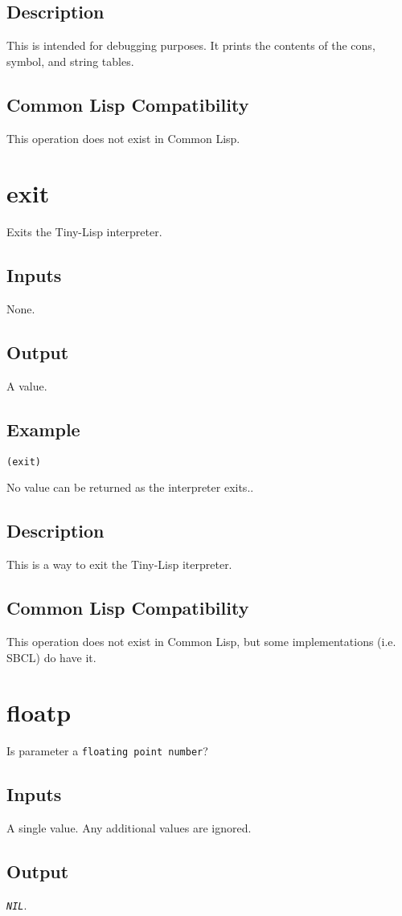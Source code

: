 \documentclass[10pt, openany]{book}
\newcommand{\constant}[1]{\emph{\texttt{#1}}}
\newcommand{\datatype}[1]{\texttt{#1}}
\newcommand{\tl}{Tiny-Lisp}
\newcommand{\cl}{Common Lisp}
\begin{document}
\subsection{Description}
This is intended for debugging purposes.  It prints the contents of the cons, symbol, and string tables.
\subsection{Common Lisp Compatibility}
This operation does not exist in \cl.

\section{exit}
Exits the \tl{} interpreter.
\subsection{Inputs}
None.
\subsection{Output}
A value.
\subsection{Example}
\begin{lstlisting}
(exit)
\end{lstlisting}
No value can be returned as the interpreter exits..
\subsection{Description}
This is a way to exit the \tl{} iterpreter.
\subsection{Common Lisp Compatibility}
This operation does not exist in \cl, but some implementations (i.e. SBCL) do have it.

\section{floatp}
Is parameter a \datatype{floating point number}?
\subsection{Inputs}
A single value.  Any additional values are ignored.
\subsection{Output}
\constant{NIL}.
\end{document}
